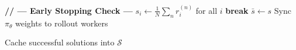 \documentclass{article}
\begin{document}
\begin{algorithm}[t]
\begin{algorithmic}[1]
        \STATE \textbf{// --- Early Stopping Check ---}
        \STATE $s_i \leftarrow \frac{1}{N}\sum_n r_i^{(n)}$ for all $i$
            \STATE \textbf{break} 
        \ENDIF
        \STATE $\bar{s} \leftarrow s$
        \STATE Sync $\pi_\theta$ weights to rollout workers

    \ENDFOR
    \STATE Cache successful solutions into $\mathcal{S}$
\ENDFOR

\end{algorithmic}
\end{algorithm}
\end{document}
